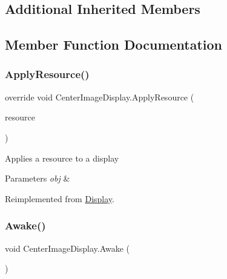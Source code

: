 \subsection*{Additional Inherited Members}


\subsection{Member Function Documentation}
\mbox{\label{class_center_image_display_a140b8b82522c1aedb473b3cd532dcd34}} 
\subsubsection{\texorpdfstring{Apply\+Resource()}{ApplyResource()}}
{\footnotesize\ttfamily override void Center\+Image\+Display.\+Apply\+Resource (\begin{DoxyParamCaption}\item[{\mbox{\hyperlink{class_base_display_resource}{Base\+Display\+Resource}}}]{resource }\end{DoxyParamCaption})\hspace{0.3cm}{\ttfamily [virtual]}}



Applies a resource to a display 


\begin{DoxyParams}{Parameters}
{\em obj} & \\
\hline
\end{DoxyParams}


Reimplemented from \mbox{\hyperlink{class_display_a811157ddb42ae4d72f690457a08711d3}{Display}}.

\mbox{\label{class_center_image_display_a413c4767daa6cca041577ba63eb3b8d5}} 
\subsubsection{\texorpdfstring{Awake()}{Awake()}}
{\footnotesize\ttfamily void Center\+Image\+Display.\+Awake (\begin{DoxyParamCaption}{ }\end{DoxyParamCaption})\hspace{0.3cm}{\ttfamily [private]}}

